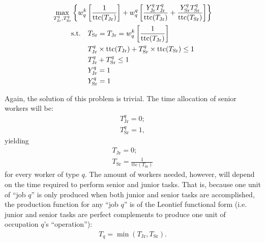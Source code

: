 \documentclass{elsarticle} %
\begin{document}
\begin{gather*}
    \max_{
        T_{\text{Jr}}^{q},
        T_{\text{Sr}}^{q}
    }{%
        \left\{
            w_{q}^{k}
            \left[
                \frac{1}{\text{ttc}(T_{\text{Jr}})}
            \right]
             + 
            w_{q}^{q}
            \left[
                \frac{
                    Y_{\text{Jr}}^{q}
                    T_{\text{Jr}}^{q}
                }{
                    \text{ttc}(T_{\text{Jr}})
                } + 
                \frac{
                    Y_{\text{Sr}}^{q}
                    T_{\text{Sr}}^{q}
                }{
                    \text{ttc}(T_{\text{Sr}})
                }
            \right]
        \right\}
    }\\
    \begin{align*}
        \text{s.t.} \quad
        & T_{\text{Sr}} = 
        T_{\text{Jr}} = 
        w_{q}^{k}
        \left[
            \frac{1}{\text{ttc}(T_{\text{Jr}})}
        \right]
        \\
        & T_{\text{Jr}}^{q} \times \text{ttc}(T_{\text{Jr}}) +
        T_{\text{Sr}}^{q} \times \text{ttc}(T_{\text{Sr}}) 
        \leq 1
        \\
        & T_{\text{Jr}}^{q} + T_{\text{Sr}}^{q} \leq 1
        \\
        & Y_{\text{Jr}}^{q} = 1
        \\
        & Y_{\text{Sr}}^{q} = 1
    \end{align*}
\end{gather*}

Again, the solution of this problem is trivial. The time allocation of senior workers will be:
\begin{gather*}
    T_{\text{Jr}}^{q} = 0
    ;\\
    T_{\text{Sr}}^{q} = 1
    ,
\end{gather*}
yielding
\begin{gather*}
    T_{\text{Jr}} = 0
    ;\\
    T_{\text{Sr}} = 
    \frac{1}{\text{ttc}(T_{\text{Sr}})}
\end{gather*}
for every worker of type $q$.
The amount of workers needed, however, will depend on the time required to perform senior and junior tasks. That is, because one unit of ``job $q$'' is only produced when both junior and senior tasks are accomplished, the production function for any ``job $q$'' is of the Leontief functional form (i.e. junior and senior tasks are perfect complements to produce one unit of occupation $q$'s ``operation''):
\begin{align*}
    T_q = \min(T_{\text{Jr}}, T_{\text{Sr}})
    .
\end{align*}
\end{document}
